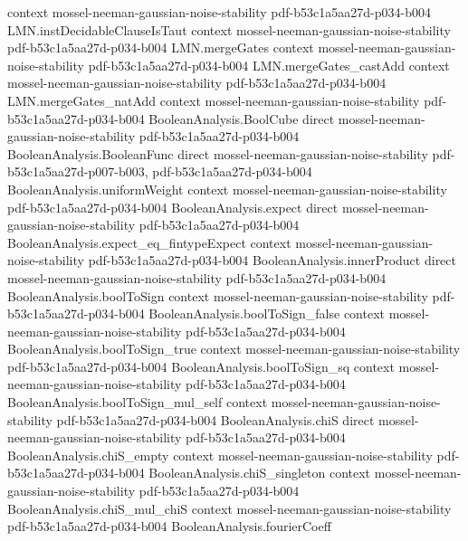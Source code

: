 \begin{theorem}
  {context}
  {mossel-neeman-gaussian-noise-stability}
  {pdf-b53c1a5aa27d-p034-b004}
\proofstep
  {LMN.instDecidableClauseIsTaut}
  {context}
  {mossel-neeman-gaussian-noise-stability}
  {pdf-b53c1a5aa27d-p034-b004}
\proofstep
  {LMN.mergeGates}
  {context}
  {mossel-neeman-gaussian-noise-stability}
  {pdf-b53c1a5aa27d-p034-b004}
\proofstep
  {LMN.mergeGates_castAdd}
  {context}
  {mossel-neeman-gaussian-noise-stability}
  {pdf-b53c1a5aa27d-p034-b004}
\proofstep
  {LMN.mergeGates_natAdd}
  {context}
  {mossel-neeman-gaussian-noise-stability}
  {pdf-b53c1a5aa27d-p034-b004}
\proofstep
  {BooleanAnalysis.BoolCube}
  {direct}
  {mossel-neeman-gaussian-noise-stability}
  {pdf-b53c1a5aa27d-p034-b004}
\proofstep
  {BooleanAnalysis.BooleanFunc}
  {direct}
  {mossel-neeman-gaussian-noise-stability}
  {pdf-b53c1a5aa27d-p007-b003,
    pdf-b53c1a5aa27d-p034-b004}
\proofstep
  {BooleanAnalysis.uniformWeight}
  {context}
  {mossel-neeman-gaussian-noise-stability}
  {pdf-b53c1a5aa27d-p034-b004}
\proofstep
  {BooleanAnalysis.expect}
  {direct}
  {mossel-neeman-gaussian-noise-stability}
  {pdf-b53c1a5aa27d-p034-b004}
\proofstep
  {BooleanAnalysis.expect_eq_fintypeExpect}
  {context}
  {mossel-neeman-gaussian-noise-stability}
  {pdf-b53c1a5aa27d-p034-b004}
\proofstep
  {BooleanAnalysis.innerProduct}
  {direct}
  {mossel-neeman-gaussian-noise-stability}
  {pdf-b53c1a5aa27d-p034-b004}
\proofstep
  {BooleanAnalysis.boolToSign}
  {context}
  {mossel-neeman-gaussian-noise-stability}
  {pdf-b53c1a5aa27d-p034-b004}
\proofstep
  {BooleanAnalysis.boolToSign_false}
  {context}
  {mossel-neeman-gaussian-noise-stability}
  {pdf-b53c1a5aa27d-p034-b004}
\proofstep
  {BooleanAnalysis.boolToSign_true}
  {context}
  {mossel-neeman-gaussian-noise-stability}
  {pdf-b53c1a5aa27d-p034-b004}
\proofstep
  {BooleanAnalysis.boolToSign_sq}
  {context}
  {mossel-neeman-gaussian-noise-stability}
  {pdf-b53c1a5aa27d-p034-b004}
\proofstep
  {BooleanAnalysis.boolToSign_mul_self}
  {context}
  {mossel-neeman-gaussian-noise-stability}
  {pdf-b53c1a5aa27d-p034-b004}
\proofstep
  {BooleanAnalysis.chiS}
  {direct}
  {mossel-neeman-gaussian-noise-stability}
  {pdf-b53c1a5aa27d-p034-b004}
\proofstep
  {BooleanAnalysis.chiS_empty}
  {context}
  {mossel-neeman-gaussian-noise-stability}
  {pdf-b53c1a5aa27d-p034-b004}
\proofstep
  {BooleanAnalysis.chiS_singleton}
  {context}
  {mossel-neeman-gaussian-noise-stability}
  {pdf-b53c1a5aa27d-p034-b004}
\proofstep
  {BooleanAnalysis.chiS_mul_chiS}
  {context}
  {mossel-neeman-gaussian-noise-stability}
  {pdf-b53c1a5aa27d-p034-b004}
\proofstep
  {BooleanAnalysis.fourierCoeff}

\end{theorem}
